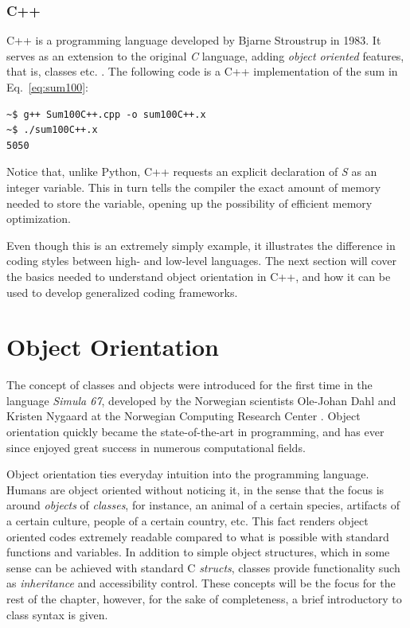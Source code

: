 \subsubsection{C++}

C++ is a programming language developed by Bjarne Stroustrup in 1983. It serves as an extension to the original \textit{C} language, adding \textit{object oriented} features, that is, classes etc. \cite{ORegan}. The following code is a C++ implementation of the sum in Eq.~\ref{eq:sum100}:

\vspace{0.5 cm}


\begin{verbatim}
~$ g++ Sum100C++.cpp -o sum100C++.x
~$ ./sum100C++.x 
5050
\end{verbatim}


Notice that, unlike Python, C++ requests an explicit declaration of \textit{S} as an integer variable. This in turn tells the compiler the exact amount of memory needed to store the variable, opening up the possibility of efficient memory optimization. 

Even though this is an extremely simply example, it illustrates the difference in coding styles between high- and low-level languages. The next section will cover the basics needed to understand object orientation in C++, and how it can be used to develop generalized coding frameworks.

\section{Object Orientation}
\label{sec:OO}

The concept of classes and objects were introduced for the first time in the language \textit{Simula 67}, developed by the Norwegian scientists Ole-Johan Dahl and Kristen Nygaard at the Norwegian Computing Research Center \cite{ORegan}. Object orientation quickly became the state-of-the-art in programming, and has ever since enjoyed great success in numerous computational fields. 

Object orientation ties everyday intuition into the programming language. Humans are object oriented without noticing it, in the sense that the focus is around \textit{objects} of \textit{classes}, for instance, an animal of a certain species, artifacts of a certain culture, people of a certain country, etc. This fact renders object oriented codes extremely readable compared to what is possible with standard functions and variables. In addition to simple object structures, which in some sense can be achieved with standard C \textit{structs}, classes provide functionality such as \textit{inheritance} and accessibility control. These concepts will be the focus for the rest of the chapter, however, for the sake of completeness, a brief introductory to class syntax is given.

